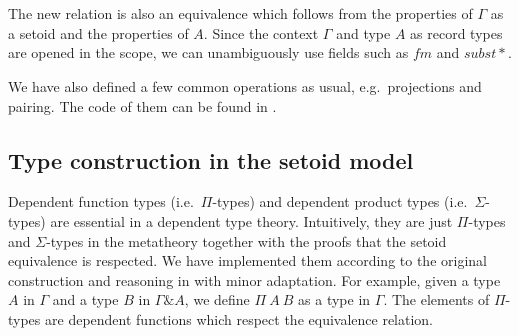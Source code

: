 \begin{code}
\\
\>[0]\<[19]%
\>[19]\AgdaFunction{[}  \AgdaSymbol{\_} \AgdaFunction{]trans} \AgdaSymbol{(}\AgdaFunction{[}  \AgdaSymbol{\_} \AgdaFunction{]trans} \<[48]%
\>[48]\<%
\\
\>[0]\<[19]%
\>[19]\AgdaSymbol{(}\AgdaFunction{[}  \AgdaSymbol{\_} \AgdaFunction{]sym} \AgdaSymbol{(} \AgdaSymbol{\_))} \AgdaSymbol{(} \AgdaSymbol{\_} \AgdaSymbol{))} \AgdaSymbol{\}}\<%
\\
\>[0]\<[9]%
\>[9]\AgdaSymbol{\}}\<%
\\
\>[0]\<[4]%
\>[4]\<%
\\
\>[4]\<[6]%
\>[6]  \<%
\\
\>[4]\<[6]%
\>[6]  \<%
\\
\end{code}

The new relation is also an equivalence which follows from the properties of $\Gamma$ as a setoid and the properties of $A$.
Since the context $\Gamma$ and type $A$ as record types are opened in the scope, we can unambiguously use fields such as $fm$ and $subst*$.

We have also defined a few common operations as usual, e.g.\ projections and pairing. The code of them can be found in .

\subsection{Type construction in the setoid model}

Dependent function types (i.e.\ $\Pi$-types) and dependent product types (i.e.\ $\Sigma$-types) are essential in a dependent type theory. Intuitively, they are just $\Pi$-types and $\Sigma$-types in the metatheory together with the proofs that the setoid equivalence is respected. We have implemented them according to the original construction and reasoning in \cite{alti:lics99} with minor adaptation.
For example, given a type $A$ in $\Gamma$ and a type $B$ in $\Gamma \& A$, we define $\Pi ~A ~B$ as a type in $\Gamma$. 
The elements of $\Pi$-types are dependent functions which respect the equivalence relation.

